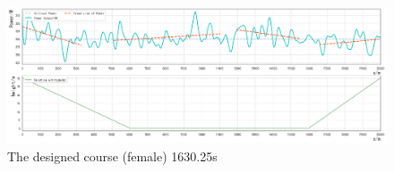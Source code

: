 \documentclass{mcmthesis}
\begin{document}
\begin{figure}[H]
\small
\centering
\includegraphics[width=13.5cm]{mcmthesis/figures/our.png}
\caption{The designed course (female) 1630.25s} 
\end{figure}
\end{document}
